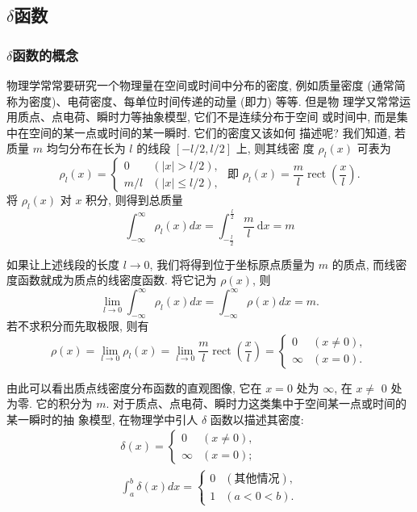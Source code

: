 \subsection{$\delta$函数}
\label{sub:delta_function}

\subsubsection{$\delta$函数的概念}

物理学常常要研究一个物理量在空间或时间中分布的密度, 例如质量密度 (通常简称为密度)、电荷密度、每单位时间传递的动量 (即力) 等等. 但是物 理学又常常运用质点、点电荷、瞬时力等抽象模型, 它们不是连续分布于空间 或时间中, 而是集中在空间的某一点或时间的某一瞬时. 它们的密度又该如何 描述呢?
我们知道, 若质量 $m$ 均匀分布在长为 $l$ 的线段 $[-l / 2, l / 2]$ 上, 则其线密 度 $\rho_l(x)$ 可表为
$$
\rho_l(x)=\left\{\begin{array}{ll}
0 & (|x|>l / 2), \\
m / l & (|x| \leqslant l / 2),
\end{array} \text { 即 } \rho_l(x)=\frac{m}{l} \operatorname{rect}\left(\frac{x}{l}\right) .\right.
$$
将 $\rho_l(x)$ 对 $x$ 积分, 则得到总质量
$$
\int_{-\infty}^{\infty} \rho_l(x) d x=\int_{-\frac{l}{2}}^{\frac{l}{2}} \frac{m}{l} \mathrm{~d} x=m
$$

如果让上述线段的长度 $l \rightarrow 0$, 我们将得到位于坐标原点质量为 $m$ 的质点, 而线密度函数就成为质点的线密度函数. 将它记为 $\rho(x)$, 则
$$
\lim _{l \rightarrow 0} \int_{-\infty}^{\infty} \rho_l(x) d x=\int_{-\infty}^{\infty} \rho(x) d x=m .
$$
若不求积分而先取极限, 则有
$$
\rho(x)=\lim _{l \rightarrow 0} \rho_l(x)=\lim _{l \rightarrow 0} \frac{m}{l} \operatorname{rect}\left(\frac{x}{l}\right)= \begin{cases}0 & (x \neq 0), \\ \infty & (x=0) .\end{cases}
$$

由此可以看出质点线密度分布函数的直观图像, 它在 $x=0$ 处为 $\infty$, 在 $x \neq$ 0 处为零. 它的积分为 $m$.
对于质点、点电荷、瞬时力这类集中于空间某一点或时间的某一瞬时的抽 象模型, 在物理学中引人 $\delta$ 函数以描述其密度:
$$
\begin{gathered}
\delta(x)= \begin{cases}0 & (x \neq 0), \\
\infty & (x=0) ;\end{cases} \\
\int_a^b \delta(x) d x= \begin{cases}0 & (\text{其他情况}), \\
1 & (a<0<b) .\end{cases}
\end{gathered}
$$
